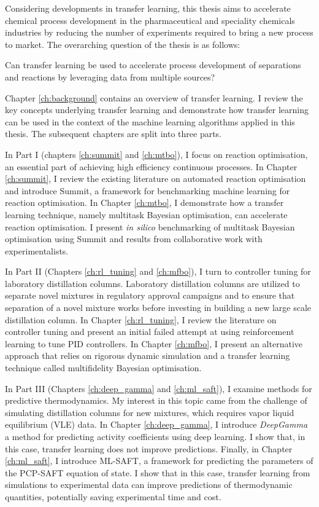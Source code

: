 Considering developments in transfer learning, this thesis aims to accelerate chemical process development in the pharmaceutical and speciality chemicals industries by reducing the number of experiments required to bring a new process to market. The overarching question of the thesis is as follows:
\begin{displayquote}
Can transfer learning be used to accelerate process development of separations and reactions by leveraging data from multiple sources? 
\end{displayquote}
Chapter \ref{ch:background} contains an overview of transfer learning. I review the key concepts underlying transfer learning and demonstrate how transfer learning can be used in the context of the machine learning algorithms applied in this thesis.  The subsequent chapters are split into three parts.

In Part I (chapters \ref{ch:summit} and \ref{ch:mtbo}), I focus on reaction optimisation, an essential part of achieving high efficiency continuous processes. In Chapter \ref{ch:summit}, I review the existing literature on automated reaction optimisation and introduce Summit, a framework for benchmarking machine learning for reaction optimisation.  In Chapter \ref{ch:mtbo}, I demonstrate how a transfer learning technique, namely multitask Bayesian optimisation, can accelerate reaction optimisation. I present \textit{in silico} benchmarking of multitask Bayesian optimisation using Summit and results from collaborative work with experimentalists.

In Part II (Chapters \ref{ch:rl_tuning} and \ref{ch:mfbo}), I turn to controller tuning for laboratory distillation columns. Laboratory distillation columns are utilized to separate novel mixtures in regulatory approval campaigns and to ensure that separation of a novel mixture works before investing in building a new large scale distillation column. In Chapter \ref{ch:rl_tuning}, I review the literature on controller tuning and present an initial failed attempt at using reinforcement learning to tune PID controllers. In Chapter \ref{ch:mfbo}, I present an alternative approach that relies on rigorous dynamic simulation and a transfer learning technique called multifidelity Bayesian optimisation.

In Part III (Chapters \ref{ch:deep_gamma} and \ref{ch:ml_saft}), I examine methods for predictive thermodynamics. My interest in this topic came from the challenge of simulating distillation columns for new mixtures, which requires vapor liquid equilibrium (VLE) data. In Chapter \ref{ch:deep_gamma}, I introduce \textit{DeepGamma} a method for predicting activity coefficients using deep learning. I show that, in this case, transfer learning does not improve predictions. Finally, in Chapter \ref{ch:ml_saft}, I introduce ML-SAFT, a framework for predicting the parameters of the PCP-SAFT equation of state. I show that in this case, transfer learning from simulations to experimental data can improve predictions of thermodynamic quantities, potentially saving experimental time and cost.





